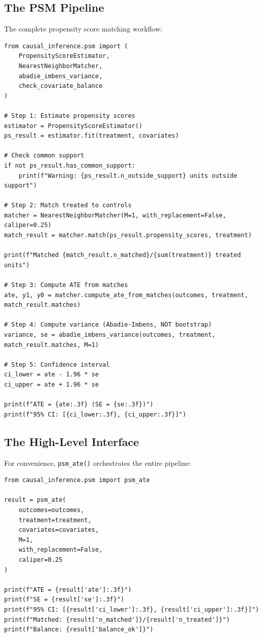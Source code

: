 \subsection{The PSM Pipeline}

The complete propensity score matching workflow:

\begin{verbatim}
from causal_inference.psm import (
    PropensityScoreEstimator,
    NearestNeighborMatcher,
    abadie_imbens_variance,
    check_covariate_balance
)

# Step 1: Estimate propensity scores
estimator = PropensityScoreEstimator()
ps_result = estimator.fit(treatment, covariates)

# Check common support
if not ps_result.has_common_support:
    print(f"Warning: {ps_result.n_outside_support} units outside support")

# Step 2: Match treated to controls
matcher = NearestNeighborMatcher(M=1, with_replacement=False, caliper=0.25)
match_result = matcher.match(ps_result.propensity_scores, treatment)

print(f"Matched {match_result.n_matched}/{sum(treatment)} treated units")

# Step 3: Compute ATE from matches
ate, y1, y0 = matcher.compute_ate_from_matches(outcomes, treatment, match_result.matches)

# Step 4: Compute variance (Abadie-Imbens, NOT bootstrap)
variance, se = abadie_imbens_variance(outcomes, treatment, match_result.matches, M=1)

# Step 5: Confidence interval
ci_lower = ate - 1.96 * se
ci_upper = ate + 1.96 * se

print(f"ATE = {ate:.3f} (SE = {se:.3f})")
print(f"95% CI: [{ci_lower:.3f}, {ci_upper:.3f}]")
\end{verbatim}

\subsection{The High-Level Interface}

For convenience, \texttt{psm\_ate()} orchestrates the entire pipeline:

\begin{verbatim}
from causal_inference.psm import psm_ate

result = psm_ate(
    outcomes=outcomes,
    treatment=treatment,
    covariates=covariates,
    M=1,
    with_replacement=False,
    caliper=0.25
)

print(f"ATE = {result['ate']:.3f}")
print(f"SE = {result['se']:.3f}")
print(f"95% CI: [{result['ci_lower']:.3f}, {result['ci_upper']:.3f}]")
print(f"Matched: {result['n_matched']}/{result['n_treated']}")
print(f"Balance: {result['balance_ok']}")
\end{verbatim}

